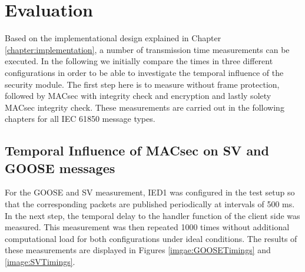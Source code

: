 \documentclass[conference, onecolumn, a4paper]{IEEEtran}
\begin{document}
\section{Evaluation}
\label{chapter:evaluation}
\noindent Based on the implementational design explained in Chapter \ref{chapter:implementation}, a number of transmission time measurements can be 
executed. In the following we initially compare the times in three different configurations in order to be able to investigate the temporal influence 
of the security module. The first step here is to measure without frame protection, followed by MACsec with integrity check and encryption and lastly 
solety MACsec integrity check. These measurements are carried out in the following chapters for all IEC 61850 message types.

\subsection{Temporal Influence of MACsec on SV and GOOSE messages}
\label{subchapter:EvalGOOSESV}
\noindent For the GOOSE and SV measurement, IED1 was configured in the test setup so that the corresponding packets are published periodically at intervals 
of 500 ms. In the next step, the temporal delay to the handler function of the client side was measured. This measurement was then repeated 1000 times 
without additional computational load for both configurations under ideal conditions. The results of these measurements are displayed in Figures 
\ref{imgae:GOOSETimings} and \ref{image:SVTimings}.
\end{document}
